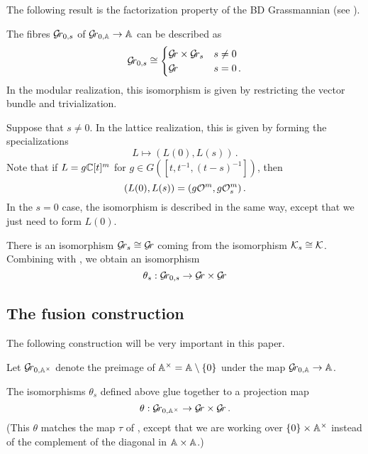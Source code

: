 \documentclass{article}
\begin{document}
The following result is the factorization property of the BD Grassmannian (see \cite[Prop. 3.13]{zhu2016introduction}).
\begin{proposition}
    \label{pr:polyno-taylor}
    The fibres $ \Gr_{0,s}$ of $ \Grbd \rightarrow \AA$ can be described as 
    \begin{equation*}
    \Gr_{0,s} \cong 
        \begin{cases} 
            \Gr \times \Gr_s & s \ne 0 \\
            \Gr              & s = 0\,.
        \end{cases}
    \end{equation*}
    In the modular realization, this isomorphism is given by restricting the vector bundle and trivialization.
    
    Suppose that $ s \ne 0 $. In the lattice realization, this is given by forming the specializations 
    $$
        L \mapsto (L(0), L(s))\,.
    $$
    Note that if $ L = g \CC[t]^m$ for $ g \in G([t,t^{-1}, (t-s)^{-1}])$, then 
    $$
        (L(0), L(s)) = (g \cO^m, g\cO^m_s)\,. 
    $$
    In the $ s = 0 $ case, the isomorphism is described in the same way, except that we just need to form $ L(0)$.
\end{proposition}

There is an isomorphism $ \Gr_s \cong \Gr $ coming from the isomorphism $ \Ks \cong \cK$. 
% 
Combining with , we obtain an isomorphism
$$
    \theta_s : \Gr_{0,s} \rightarrow \Gr \times \Gr 
$$
% 

\subsection{The fusion construction}
\label{ss:fuscon}

The following construction will be very important in this paper.  

Let $ \Gr_{0, \AA^\times} $ denote the preimage of $\Ax = \AA \setminus \{0\}$ under the map $\Gr_{0,\AA} \rightarrow \AA $.  

The isomorphisms $ \theta_s $ defined above glue together to a projection map
\begin{equation}
\label{eq:mvitau}
    \theta : \Gr_{0, \AA^\times} \rightarrow \Gr \times \Gr \, .
\end{equation}
(This $\theta$ matches the map $ \tau $ of \cite{mirkovic2007geometric}, except that we are working over $ \{0 \} \times \AA^\times$ instead of the complement of the diagonal in $ \AA\times\AA $.)
\end{document}
